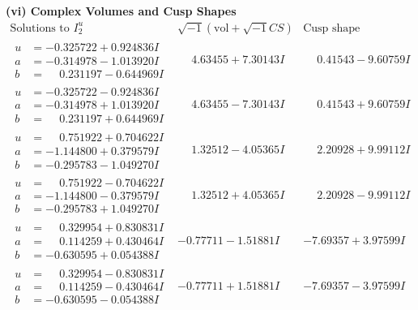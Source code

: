 \documentclass[1p]{elsarticle_modified}
\theoremstyle{definition}
\newcommand{\I}{\sqrt{-1}}
\begin{document}
\newpage\flushleft \textbf{(vi) Complex Volumes and Cusp Shapes}
$$\begin{array}{c|c|c}  
\text{Solutions to }I^u_{2}& \I (\text{vol} + \sqrt{-1}CS) & \text{Cusp shape}\\
 \hline 
\begin{aligned}
u &= -0.325722 + 0.924836 I \\
a &= -0.314978 - 1.013920 I \\
b &= \phantom{-}0.231197 - 0.644969 I\end{aligned}
 & \phantom{-}4.63455 + 7.30143 I & \phantom{-}0.41543 - 9.60759 I \\ \hline\begin{aligned}
u &= -0.325722 - 0.924836 I \\
a &= -0.314978 + 1.013920 I \\
b &= \phantom{-}0.231197 + 0.644969 I\end{aligned}
 & \phantom{-}4.63455 - 7.30143 I & \phantom{-}0.41543 + 9.60759 I \\ \hline\begin{aligned}
u &= \phantom{-}0.751922 + 0.704622 I \\
a &= -1.144800 + 0.379579 I \\
b &= -0.295783 - 1.049270 I\end{aligned}
 & \phantom{-}1.32512 - 4.05365 I & \phantom{-}2.20928 + 9.99112 I \\ \hline\begin{aligned}
u &= \phantom{-}0.751922 - 0.704622 I \\
a &= -1.144800 - 0.379579 I \\
b &= -0.295783 + 1.049270 I\end{aligned}
 & \phantom{-}1.32512 + 4.05365 I & \phantom{-}2.20928 - 9.99112 I \\ \hline\begin{aligned}
u &= \phantom{-}0.329954 + 0.830831 I \\
a &= \phantom{-}0.114259 + 0.430464 I \\
b &= -0.630595 + 0.054388 I\end{aligned}
 & -0.77711 - 1.51881 I & -7.69357 + 3.97599 I \\ \hline\begin{aligned}
u &= \phantom{-}0.329954 - 0.830831 I \\
a &= \phantom{-}0.114259 - 0.430464 I \\
b &= -0.630595 - 0.054388 I\end{aligned}
 & -0.77711 + 1.51881 I & -7.69357 - 3.97599 I \\ \hline\begin{aligned}

\end{aligned}
\end{array}$$
\end{document}
